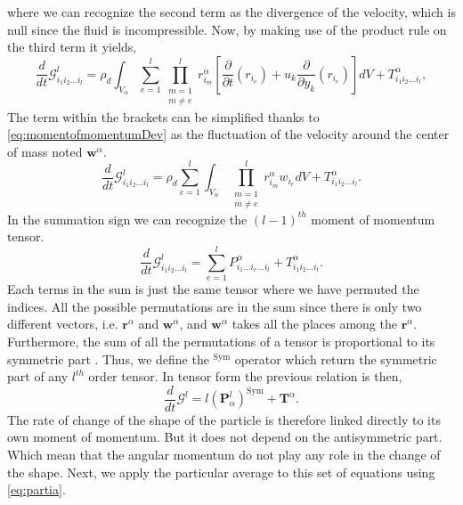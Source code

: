 where we can recognize the second term as the divergence of the velocity, which is null since the fluid is incompressible. 
Now, by making use of the product rule on the third term it yields,
\begin{equation}
    \frac{d}{dt}\mathcal{G}_{i_1i_2\ldots i_l}^l 
    = \rho_d \int_{V_\alpha} \sum_{e=1}^l \prod^l_{\substack{ m=1 \\   m \neq e}} r^\alpha_{i_m}\left[ \frac{\partial}{\partial t} \left(r_{i_e}\right) 
    + u_k \frac{\partial}{\partial y_k} \left(r_{i_e}\right) \right]dV
    +T^\alpha_{i_1i_2\ldots i_l},
\end{equation}
The term within the brackets can be simplified thanks to \ref{eq:momentofmomentumDev} as the fluctuation of the velocity around the center of mass noted $\bm{w}^\alpha$.
\begin{equation}
    \frac{d}{dt}\mathcal{G}_{i_1i_2\ldots i_l}^l 
    = \rho_d \sum_{e=1}^l \int_{V_\alpha}  \prod^l_{\substack{ m=1 \\   m \neq e}} r^\alpha_{i_m} w_{i_e}dV
    +T^\alpha_{i_1i_2\ldots i_l}.
\end{equation}
In the summation sign we can recognize the $(l-1)^{th}$ moment of momentum tensor. 
\begin{equation}
    \frac{d}{dt}\mathcal{G}_{i_1i_2\ldots i_l}^l 
    = \sum_{e=1}^l P^\alpha_{i_1\ldots i_e\ldots i_l}
    +T^\alpha_{i_1i_2\ldots i_l}.
\end{equation}
Each terms in the sum is just the same tensor where we have permuted the indices. 
All the possible permutations are in the sum since there is only two different vectors, i.e. $\bm{r}^\alpha$ and $\bm{w}^\alpha$, and $\bm{w}^\alpha$ takes all the places among the $\bm{r}^\alpha$.
Furthermore, the sum of all the permutations of a tensor is proportional to its symmetric part \citep{itin2022decomposition}. 
Thus, we define the $^\text{Sym}$ operator which return the symmetric part of any $l^{th}$ order tensor. 
In tensor form the previous relation is then,
\begin{equation}
    \frac{d}{dt}\mathcal{G}^l 
    = l (\bm{P}_\alpha^l)^{\text{Sym}}
    +\bm{T}^\alpha.
    \label{eq:dt_G_alpha_l}
\end{equation}
The rate of change of the shape of the particle is therefore linked directly to its own moment of momentum. 
But it does not depend on the antisymmetric part. 
Which mean that the angular momentum do not play any role in the change of the shape. 
Next, we apply the particular average to this set of equations using \ref{eq:partia}.
